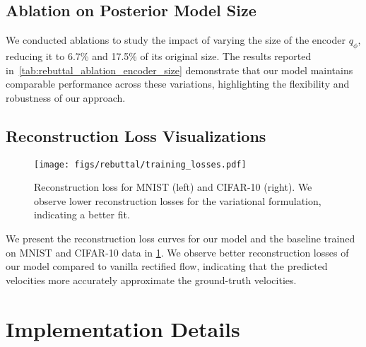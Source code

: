 \subsection{Ablation on Posterior Model Size}

We conducted ablations to study the impact of varying the  size of the encoder $q_\phi$, reducing it to 6.7\% and 17.5\% of its original size. The results reported in~\cref{tab:rebuttal_ablation_encoder_size} demonstrate that our model maintains comparable performance across these variations, highlighting the flexibility and robustness of our approach. 



\subsection{Reconstruction Loss Visualizations}

\begin{figure}[t]
    \centering
    \texttt{[image: figs/rebuttal/training\_losses.pdf]} \\
    \caption{Reconstruction loss  for MNIST (left) and CIFAR-10 (right). We observe lower reconstruction losses for the variational formulation, indicating a better fit. }
    \label{fig:rebuttal_training_loss}
    \vspace{2em}
\end{figure}
We present the reconstruction loss curves for our model and the baseline trained on  MNIST and CIFAR-10 data in \cref{fig:rebuttal_training_loss}. We observe better reconstruction losses of our model compared to vanilla rectified flow, indicating that the predicted velocities more accurately approximate the ground-truth velocities.






























\section{Implementation Details}
\label{app:implement_all}
